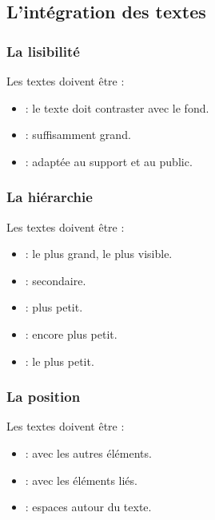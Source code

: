 \subsection{L'intégration des textes}

\subsubsection{La lisibilité}

Les textes doivent être  :

\begin{itemize}
    \item {} : le texte doit contraster avec le fond.
    \item {} : suffisamment grand.
    \item {} : adaptée au support et au public.
\end{itemize}

\subsubsection{La hiérarchie}

Les textes doivent être  :

\begin{itemize}
    \item {} : le plus grand, le plus visible.
    \item {} : secondaire.
    \item {} : plus petit.
    \item {} : encore plus petit.
    \item {} : le plus petit.
\end{itemize}

\subsubsection{La position}

Les textes doivent être  :

\begin{itemize}
    \item {} : avec les autres éléments.
    \item {} : avec les éléments liés.
    \item {} : espaces autour du texte.
\end{itemize}

